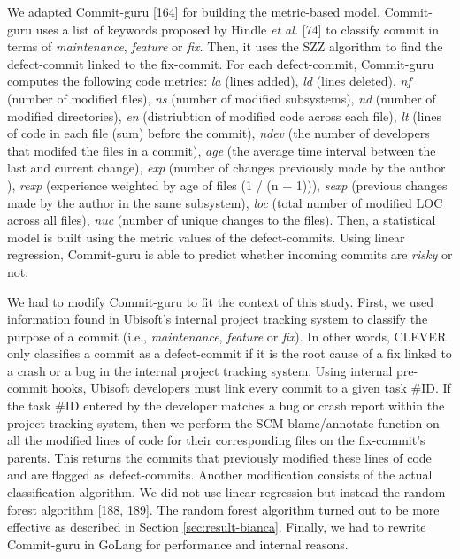 \documentclass[12pt]{report}
\begin{document}
We adapted Commit-guru {[}164{]} for building the metric-based model.
Commit-guru uses a list of keywords proposed by Hindle \emph{et al.}
{[}74{]} to classify commit in terms of \emph{maintenance},
\emph{feature} or \emph{fix}. Then, it uses the SZZ algorithm to find
the defect-commit linked to the fix-commit. For each defect-commit,
Commit-guru computes the following code metrics: \emph{la} (lines
added), \emph{ld} (lines deleted), \emph{nf} (number of modified files),
\emph{ns} (number of modified subsystems), \emph{nd} (number of modified
directories), \emph{en} (distriubtion of modified code across each
file), \emph{lt} (lines of code in each file (sum) before the commit),
\emph{ndev} (the number of developers that modifed the files in a
commit), \emph{age} (the average time interval between the last and
current change), \emph{exp} (number of changes previously made by the
author ), \emph{rexp} (experience weighted by age of files (1 / (n +
1))), \emph{sexp} (previous changes made by the author in the same
subsystem), \emph{loc} (total number of modified LOC across all files),
\emph{nuc} (number of unique changes to the files). Then, a statistical
model is built using the metric values of the defect-commits. Using
linear regression, Commit-guru is able to predict whether incoming
commits are \emph{risky} or not.

We had to modify Commit-guru to fit the context of this study. First, we
used information found in Ubisoft's internal project tracking system to
classify the purpose of a commit (i.e., \emph{maintenance},
\emph{feature} or \emph{fix}). In other words, CLEVER only classifies a
commit as a defect-commit if it is the root cause of a fix linked to a
crash or a bug in the internal project tracking system. Using internal
pre-commit hooks, Ubisoft developers must link every commit to a given
task \#ID. If the task \#ID entered by the developer matches a bug or
crash report within the project tracking system, then we perform the SCM
blame/annotate function on all the modified lines of code for their
corresponding files on the fix-commit's parents. This returns the
commits that previously modified these lines of code and are flagged as
defect-commits. Another modification consists of the actual
classification algorithm. We did not use linear regression but instead
the random forest algorithm {[}188, 189{]}. The random forest algorithm
turned out to be more effective as described in Section
\ref{sec:result-bianca}. Finally, we had to rewrite Commit-guru in
GoLang for performance and internal reasons.
\end{document}
